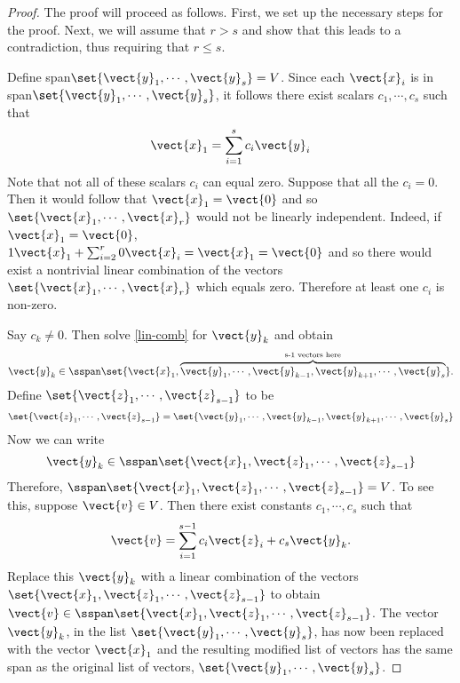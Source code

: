 \begin{proof} The proof will proceed as follows. First, we set up the necessary steps for the proof. Next, we will assume that $r > s$ and show that this leads to a contradiction, thus requiring that $r \leq s$. 

Define span$\set{\vect{y}_{1},\cdots ,\vect{y}_{s}} = V$. Since each $\vect{x}_i$ is in  span$\set{\vect{y}_{1},\cdots ,\vect{y}_{s}}$, it follows there exist scalars $c_{1},\cdots ,c_{s}$
such that 
\begin{equation}
\vect{x}_{1}=\sum_{i=1}^{s}c_{i}\vect{y}_{i}  \label{lin-comb}
\end{equation}
Note that not all of these scalars $c_i$ can equal zero. Suppose that all the $c_i=0$. Then it
would follow that $\vect{x}_{1}=\vect{0}$ and so $\set{\vect{x}
_{1},\cdots ,\vect{x}_{r}} $ would not be linearly independent.
Indeed, if $\vect{x}_{1}=\vect{0}$, $1\vect{x}_{1}+\sum_{i=2}^{r}0
\vect{x}_{i}=\vect{x}_{1}=\vect{0}$ and so there would exist a
nontrivial linear combination of the vectors $\set{\vect{x}_{1},\cdots ,
\vect{x}_{r}} $ which equals zero. Therefore at least one $c_i$ is non-zero. 

Say $c_{k}\neq 0$. Then solve {\eqref{lin-comb}} for $\vect{y}_{k}$ and obtain 
\begin{equation*}
\vect{y}_{k}\in \sspan\set{\vect{x}_{1},\overset{\text{s-1
vectors here}}{\overbrace{\vect{y}_{1},\cdots ,\vect{y}_{k-1},\vect{y}
_{k+1},\cdots ,\vect{y}_{s}}}} .
\end{equation*}
Define $\set{\vect{z}_{1},\cdots ,\vect{z}_{s-1}} $ to be
\begin{equation*}
\set{\vect{z}_{1},\cdots ,\vect{z}_{s-1}} = \set{
\vect{y}_{1},\cdots ,\vect{y}_{k-1},\vect{y}_{k+1},\cdots ,\vect{y}
_{s}}
\end{equation*}
Now we can write 
\begin{equation*}
\vect{y}_{k}\in \sspan\set{\vect{x}_{1}, \vect{z}_{1},\cdots, \vect{z}_{s-1}} 
\end{equation*}
Therefore, $\sspan\set{\vect{x}_{1},\vect{z}_{1},\cdots ,\vect{z
}_{s-1}}=V$. To see this, suppose $\vect{v}\in V$. Then there exist constants $
c_{1},\cdots ,c_{s}$ such that 
\begin{equation*}
\vect{v}=\sum_{i=1}^{s-1}c_{i}\vect{z}_{i}+c_{s}\vect{y}_{k}.
\end{equation*}
Replace this $\vect{y}_{k}$ with a linear combination of the
vectors $\set{\vect{x}_{1},\vect{z}_{1},\cdots ,\vect{z}_{s-1}}$
to obtain $\vect{v}\in \sspan\set{\vect{x}_{1},\vect{z}
_{1},\cdots ,\vect{z}_{s-1}}$. The vector $\vect{y}_{k}$, in the
list $\set{\vect{y}_{1},\cdots ,\vect{y}_{s}}$, has now been
replaced with the vector $\vect{x}_{1}$ and the resulting modified list of
vectors has the same span as the original list of vectors, $\set{\vect{y
}_{1},\cdots ,\vect{y}_{s}}$.


\end{proof}
